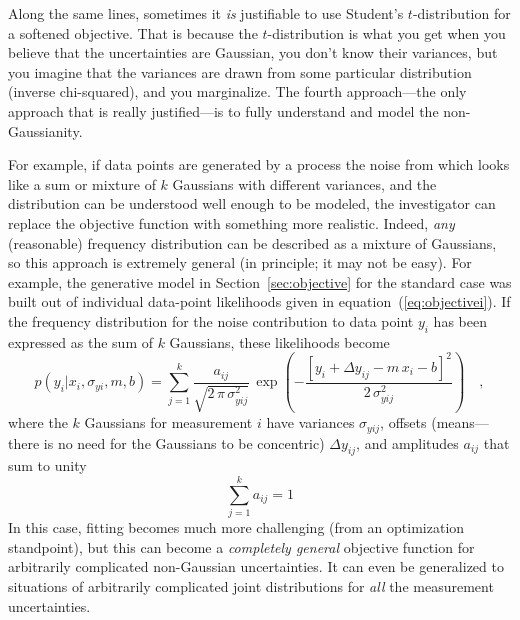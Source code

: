 \documentclass[12pt,twoside]{article}
\newcommand{\sectionname}{Section}
\newcommand{\equationname}{equation}
\begin{document}
{  Along the same lines, sometimes it \emph{is} justifiable to use
  Student's $t$-distribution for a softened objective.  That is
  because the $t$-distribution is what you get when you believe that
  the uncertainties are Gaussian, you don't know their variances, but
  you imagine that the variances are drawn from some particular
  distribution (inverse chi-squared), and you marginalize.}  The
fourth approach---the only approach that is really justified---is to
fully understand and model the non-Gaussianity.

For example, if data points are generated by a process the noise from
which looks like a sum or mixture of $k$ Gaussians with different
variances, and the distribution can be understood well enough to be
modeled, the investigator can replace the objective function with
something more realistic.  Indeed, \emph{any} (reasonable) frequency
distribution can be described as a mixture of Gaussians, so this
approach is extremely general (in principle; it may not be easy).  For
example, the generative model in \sectionname~\ref{sec:objective} for
the standard case was built out of individual data-point likelihoods
given in \equationname~(\ref{eq:objectivei}).  If the frequency
distribution for the noise contribution to data point $y_i$ has been
expressed as the sum of $k$ Gaussians, these likelihoods become
\begin{equation}
p(y_i|x_i,\sigma_{yi},m,b) = \sum_{j=1}^k
 \frac{a_{ij}}{\sqrt{2\,\pi\,\sigma_{yij}^2}}
 \,\exp\left(-\frac{[y_i+\Delta y_{ij}-m\,x_i-b]^2}{2\,\sigma_{yij}^2}\right)
 \quad ,
\end{equation}
where the $k$ Gaussians for measurement $i$ have variances
$\sigma_{yij}$, offsets (means---there is no need for the Gaussians to
be concentric) $\Delta y_{ij}$, and amplitudes $a_{ij}$ that sum to
unity
\begin{equation}
\sum_{j=1}^k a_{ij} = 1
\end{equation}
In this case, fitting becomes much more challenging (from an
optimization standpoint), but this can become a \emph{completely
  general} objective function for arbitrarily complicated non-Gaussian
uncertainties.  It can even be generalized to situations of
arbitrarily complicated joint distributions for \emph{all} the
measurement uncertainties.
\end{document}

